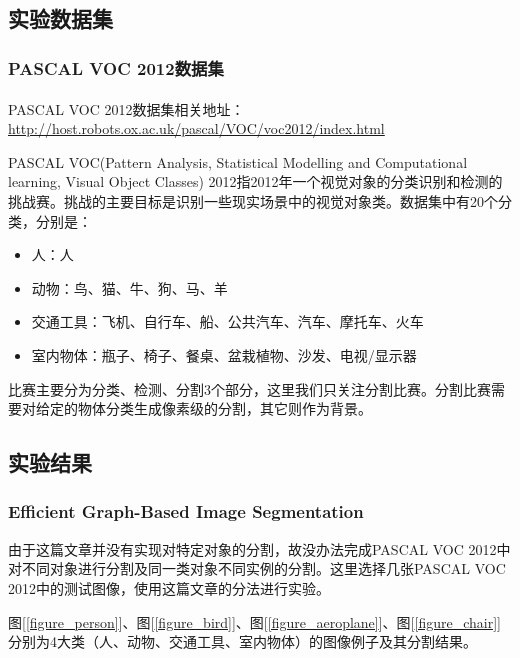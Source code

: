 \documentclass[a4paper, 12pt, UTF8]{article}
\begin{document}
\subsection{实验数据集}

\subsubsection{PASCAL VOC 2012数据集}

PASCAL VOC 2012\textsuperscript{\cite{ref2}}数据集相关地址：\url{http://host.robots.ox.ac.uk/pascal/VOC/voc2012/index.html}

PASCAL VOC(Pattern Analysis, Statistical Modelling and Computational learning, Visual Object Classes) 2012指2012年一个视觉对象的分类识别和检测的挑战赛。挑战的主要目标是识别一些现实场景中的视觉对象类。数据集中有20个分类，分别是：

\begin{itemize}

\item 人：人

\item 动物：鸟、猫、牛、狗、马、羊

\item 交通工具：飞机、自行车、船、公共汽车、汽车、摩托车、火车

\item 室内物体：瓶子、椅子、餐桌、盆栽植物、沙发、电视/显示器

\end{itemize}

比赛主要分为分类、检测、分割3个部分，这里我们只关注分割比赛。分割比赛需要对给定的物体分类生成像素级的分割，其它则作为背景。

\subsection{实验结果}

\subsubsection{Efficient Graph-Based Image Segmentation}

由于这篇文章并没有实现对特定对象的分割，故没办法完成PASCAL VOC 2012中对不同对象进行分割及同一类对象不同实例的分割。这里选择几张PASCAL VOC 2012中的测试图像，使用这篇文章的分法进行实验。

图[\ref{figure_person}]、图[\ref{figure_bird}]、图[\ref{figure_aeroplane}]、图[\ref{figure_chair}]分别为4大类（人、动物、交通工具、室内物体）的图像例子及其分割结果。
\end{document}
